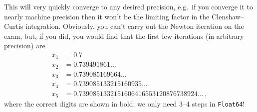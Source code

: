 \documentclass[12pt]{article}
\newcommand{\newexampage}{\newpage $\mbox{}$}
\newcommand{\newexampage}{}
\begin{document}
{\begin{enumerate}
This will very quickly converge to any desired precision, e.g.~if you converge it to nearly machine precision then it won't be the limiting factor in the Clenshaw--Curtis integration.   Obviously, you can't carry out the Newton iteration on the exam, but, if you did, you would find that the first few iterations (in arbitrary precision) are
\begin{align*}
x_1 &= \mathbf{0.7}\\
x_2 &= \mathbf{0.739}491861\ldots \\
x_3 &= \mathbf{0.7390851}69664\ldots \\
x_4 &= \mathbf{0.739085133215160}935\ldots \\
x_5 &= \mathbf{ 0.7390851332151606416553120876738}924\ldots
\, ,
\end{align*}
where the correct digits are shown in bold: we only need 3--4 steps in \texttt{Float64}!
\end{enumerate}
}

\newexampage
\end{document}
